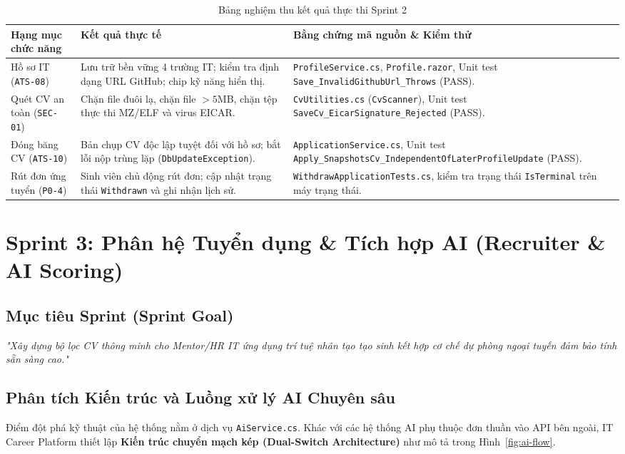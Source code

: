 \begin{table}[htbp]
\centering
\small
\caption{Bảng nghiệm thu kết quả thực thi Sprint 2}
\label{tab:sprint2-results}
\begin{tabularx}{\textwidth}{p{3.2cm} p{3.8cm} X}
\toprule
\textbf{Hạng mục chức năng} & \textbf{Kết quả thực tế} & \textbf{Bằng chứng mã nguồn \& Kiểm thử} \\
\midrule
Hồ sơ IT (\texttt{ATS-08}) & Lưu trữ bền vững 4 trường IT; kiểm tra định dạng URL GitHub; chip kỹ năng hiển thị. & \texttt{ProfileService.cs}, \texttt{Profile.razor}, Unit test \texttt{Save\_InvalidGithubUrl\_Throws} (PASS). \\
\addlinespace
Quét CV an toàn (\texttt{SEC-01}) & Chặn file đuôi lạ, chặn file $>5$MB, chặn tệp thực thi MZ/ELF và virus EICAR. & \texttt{CvUtilities.cs} (\texttt{CvScanner}), Unit test \texttt{SaveCv\_EicarSignature\_Rejected} (PASS). \\
\addlinespace
Đóng băng CV (\texttt{ATS-10}) & Bản chụp CV độc lập tuyệt đối với hồ sơ; bắt lỗi nộp trùng lặp (\texttt{DbUpdateException}). & \texttt{ApplicationService.cs}, Unit test \texttt{Apply\_SnapshotsCv\_IndependentOfLaterProfileUpdate} (PASS). \\
\addlinespace
Rút đơn ứng tuyển (\texttt{P0-4}) & Sinh viên chủ động rút đơn; cập nhật trạng thái \texttt{Withdrawn} và ghi nhận lịch sử. & \texttt{WithdrawApplicationTests.cs}, kiểm tra trạng thái \texttt{IsTerminal} trên máy trạng thái. \\
\bottomrule
\end{tabularx}
\end{table}

\section{Sprint 3: Phân hệ Tuyển dụng \& Tích hợp AI (Recruiter \& AI Scoring)}
\label{sec:sprint-3}

\subsection{Mục tiêu Sprint (Sprint Goal)}
\textit{"Xây dựng bộ lọc CV thông minh cho Mentor/HR IT ứng dụng trí tuệ nhân tạo tạo sinh kết hợp cơ chế dự phòng ngoại tuyến đảm bảo tính sẵn sàng cao."}

\subsection{Phân tích Kiến trúc và Luồng xử lý AI Chuyên sâu}
Điểm đột phá kỹ thuật của hệ thống nằm ở dịch vụ \texttt{AiService.cs}. Khác với các hệ thống AI phụ thuộc đơn thuần vào API bên ngoài, IT Career Platform thiết lập \textbf{Kiến trúc chuyển mạch kép (Dual-Switch Architecture)} như mô tả trong Hình~\ref{fig:ai-flow}.

